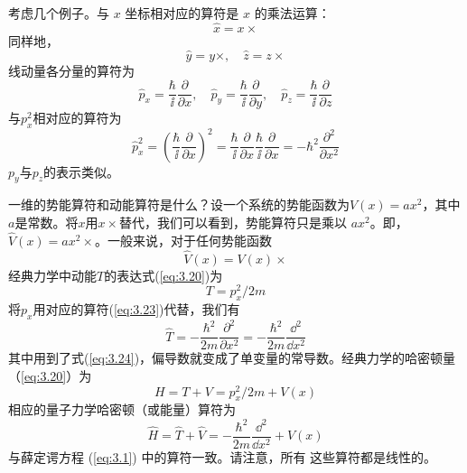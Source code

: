 	考虑几个例子。与 $x$ 坐标相对应的算符是 $x$ 的乘法运算：
	\begin{equation}
		\boxed{
			\hat{x} = x \times
		}
		\label{eq:3.21}
	\end{equation}
	同样地，
	\begin{equation}
		\boxed{
			\hat{y} = y \times, \quad \hat{z} = z \times
		}
		\label{eq:3.22}
	\end{equation}
	线动量各分量的算符为
	\begin{equation}
		\boxed{
			\hat{p}_x = \frac{\hbar}{\ii }\frac{\partial}{\partial x}, \quad \hat{p}_y = \frac{\hbar}{\ii }\frac{\partial}{\partial y}, \quad \hat{p}_z = \frac{\hbar}{\ii }\frac{\partial}{\partial z}
		}
		\label{eq:3.23}
	\end{equation}
	与$p_x^2$相对应的算符为
	\begin{equation}
		\hat{p}_x^2 = \left(\frac{\hbar}{\ii } \frac{\partial}{\partial x}\right)^2 = \frac{\hbar}{\ii } \frac{\partial}{\partial x}\frac{\hbar}{\ii } \frac{\partial}{\partial x} = -\hbar^2 \frac{\partial^2}{\partial x^2}
		\label{eq:3.24}
	\end{equation}
	$p_y$与$p_z$的表示类似。

	一维的势能算符和动能算符是什么？设一个系统的势能函数为$V\left(x\right) = ax^2$，其中$a$是常数。将$x$用$x \times$替代，我们可以看到，势能算符只是乘以 $ax^2$。即，$\hat{V}\left(x\right) = ax^2 \times$。一般来说，对于任何势能函数
	\begin{equation}
		\boxed{
			\hat{V}\left(x\right) = V\left(x\right) \times 
		}
		\label{eq:3.25 definition of potential energy operator}
	\end{equation}
	经典力学中动能$T$的表达式(\ref{eq:3.20})为
	\begin{equation}
		\boxed{
			T = p_x^2 / 2m
		}
		\label{eq:3.26}
	\end{equation}
	将$p_x$用对应的算符(\ref{eq:3.23})代替，我们有
	\begin{equation}
		\hat{T} = -\frac{\hbar^2}{2m}\frac{\partial^2}{\partial x^2} = -\frac{\hbar^2}{2m}\frac{\dd ^2}{\dd x^2}
		\label{eq:3.27}
	\end{equation}
	其中用到了式(\ref{eq:3.24})，偏导数就变成了单变量的常导数。经典力学的哈密顿量（\ref{eq:3.20}）为
	\begin{equation}
		H = T + V = p_x^2/2m+V\left(x\right)
		\label{eq:3.28}
	\end{equation}
	相应的量子力学哈密顿（或能量）算符为
	\begin{equation}
		\boxed{
			\hat{H} = \hat{T} + \hat{V} = -\frac{\hbar^2}{2m}\frac{\dd ^2}{\dd x^2}+V\left(x\right)
		}
		\label{eq:3.29}
	\end{equation}
	与薛定谔方程 (\ref{eq:3.1}) 中的算符一致。请注意，所有
	这些算符都是线性的。

